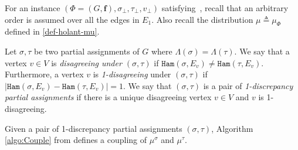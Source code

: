 \documentclass[11pt]{article}
\newcommand{\abs}[1]{\left\vert#1\right\vert}
\def\!#1{\mathtt{#1}}
\newcommand{\vecf}{\boldsymbol{f}}
\newcommand{\hktodo}[1]{{\color{blue}{#1}}}
\begin{document}
For an instance $(\Phi = (G, \vecf), \sigma_\bot, \tau_\bot, v_\bot)$ satisfying~, recall that an arbitrary order is assumed over all the edges in $E_1$.
Also recall the distribution $\mu \triangleq \mu_{\Phi}$ defined in \eqref{def-holant-mu}.

\hktodo{move the notation disagreeing and discrepancy}
    
    Let $\sigma, \tau$ be two partial assignments of $G$ where $\Lambda(\sigma) = \Lambda(\tau)$.
    We say that a vertex $v \in V$ is \emph{disagreeing under $(\sigma, \tau)$} if ${\!{Ham}\left(\sigma,{E_v}\right)}\neq{\!{Ham}\left(\tau,{E_v}\right)}$. Furthermore, a vertex $v$ is \emph{1-disagreeing} under $(\sigma, \tau)$ if $\abs{{\!{Ham}\left(\sigma,{E_v}\right)}-{\!{Ham}\left(\tau,{E_v}\right)}}=1$.
    We say that $(\sigma, \tau)$ is a pair of \emph{1-discrepancy partial assignments} if there is a unique disagreeing vertex $v \in V$ and $v$ is 1-disagreeing.

    Given a pair of 1-discrepancy partial assignments $(\sigma,\tau)$,
    Algorithm \ref{algo:Couple} from \cite{CG24bMatching} defines a 
    coupling of $\mu^{\sigma}$ and $\mu^{\tau}$.
    \hktodo{the use of the coupling in our paper}
\end{document}
